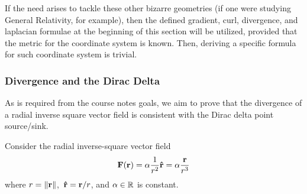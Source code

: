 			If the need arises to tackle these other bizarre geometries (if one were 
			studying General Relativity, for example), then the defined gradient, curl, divergence, and laplacian
			formulae at the beginning of this section will be utilized, provided that the metric for the 
			coordinate system is known. Then, deriving a specific formula for such coordinate system
			is trivial.
			\newpage
	\subsubsection{Divergence and the Dirac Delta}
		As is required from the course notes goals, we aim to prove that the
		divergence of a radial inverse square vector field is consistent with
		the Dirac delta point source/sink.

		Consider the radial inverse-square vector field
		\begin{equation}
			\vb{F}(\vb{r}) = \alpha \frac{1}{r^2}\vu{r} = \alpha \frac{\vb{r}}{r^3}  
		\end{equation}
		where $r = \norm{\vb{r}}$,\ $\vu{r}=\vb{r}/r$, and $\alpha\in\mathbb{R}$ is constant.
		
